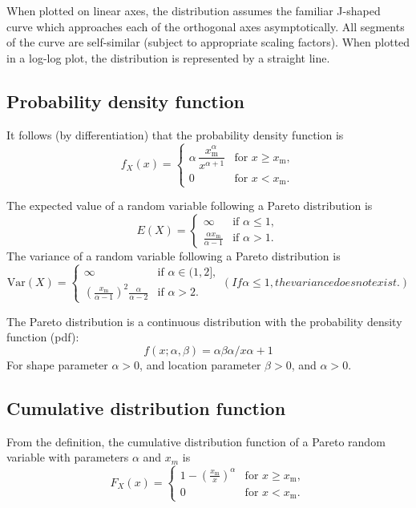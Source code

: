 \documentclass[]{report}
\begin{document}
When plotted on linear axes, the distribution assumes the familiar J-shaped curve which approaches each of the orthogonal axes asymptotically. All segments of the curve are self-similar (subject to appropriate scaling factors). When plotted in a log-log plot, the distribution is represented by a straight line.
\subsection{Probability density function}
It follows (by differentiation) that the probability density function is
\[
f_X(x)= \begin{cases} \alpha\,\dfrac{x_\mathrm{m}^\alpha}{x^{\alpha+1}} & \mbox{for }x \ge x_\mathrm{m}, \\[12pt] 0 & \mbox{for } x < x_\mathrm{m}. \end{cases} 
\]



The expected value of a random variable following a Pareto distribution is
\[
E(X)= \begin{cases} \infty & \text{if }\alpha\le 1, \\ \frac{\alpha x_\mathrm{m}}{\alpha-1} & \text{if }\alpha>1. \end{cases}
\]
The variance of a random variable following a Pareto distribution is
\[
\mathrm{Var}(X)= \begin{cases} \infty & \text{if }\alpha\in(1,2], \\ \left(\frac{x_\mathrm{m}}{\alpha-1}\right)^2 \frac{\alpha}{\alpha-2} & \text{if }\alpha>2. \end{cases}
(If \alpha\le 1, the variance does not exist.)
\]






The Pareto distribution is 
a continuous distribution with the probability density function (pdf):
\[
f(x; \alpha, \beta) = \alpha\beta\alpha / x\alpha+ 1
\]
For shape parameter $\alpha > 0$, and location parameter $\beta > 0$, and $\alpha > 0$.



\subsection{Cumulative distribution function}

From the definition, the cumulative distribution function of a Pareto random variable with parameters $\alpha$ and $x_m$ is
\[F_X(x) = \begin{cases}
1-\left(\frac{x_\mathrm{m}}{x}\right)^\alpha & \mbox{for } x \ge x_\mathrm{m}, \\
0 & \mbox{for }x < x_\mathrm{m}.
\end{cases}
\]
\end{document}
